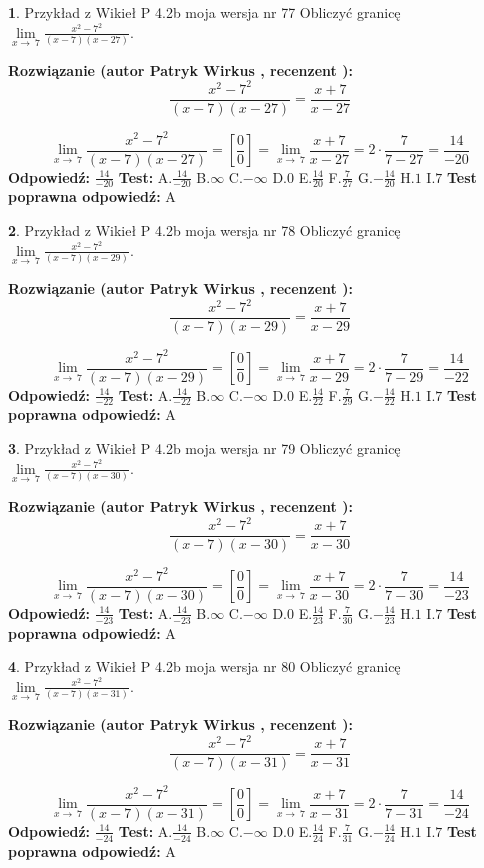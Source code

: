 \documentclass[12pt, a4paper]{article}
\theoremstyle{definition} %
\newtheorem{zad}{}
\newcommand{\zadStart}[1]{\begin{zad}#1\newline}
\newcommand{\zadStop}{\end{zad}}
\newcommand{\rozwStart}[2]{\noindent \textbf{Rozwiązanie (autor #1 , recenzent #2): }\newline}
\newcommand{\rozwStop}{\newline}
\newcommand{\odpStart}{\noindent \textbf{Odpowiedź:}\newline}
\newcommand{\odpStop}{\newline}
\newcommand{\testStart}{\noindent \textbf{Test:}\newline}
\newcommand{\testStop}{\newline}
\newcommand{\kluczStart}{\noindent \textbf{Test poprawna odpowiedź:}\newline}
\newcommand{\kluczStop}{\newline}
\begin{document}
\zadStart{Przykład z Wikieł P 4.2b moja wersja nr 77}
Obliczyć granicę $\lim\limits_{x\to\ 7}\frac{x^{2}-7^{2}}{(x-7)(x-27)}$.
\zadStop
\rozwStart{Patryk Wirkus}{}
$$\frac{x^{2}-7^{2}}{(x-7)(x-27)}=\frac{x+7}{x-27}$$

$$\lim\limits_{x\to\ 7}\frac{x^{2}-7^{2}}{(x-7)(x-27)}=[\frac{0}{0}]=\lim\limits_{x\to\ 7}\frac{x+7}{x-27}=2 \cdot \frac{7}{7-27} = \frac{14}{-20}$$
\rozwStop
\odpStart
$\frac{14}{-20}$
\odpStop
\testStart
A.$\frac{14}{-20}$
B.$\infty$
C.$-\infty$
D.$0$
E.$\frac{14}{20}$
F.$\frac{7}{27}$
G.$-\frac{14}{20}$
H.$1$
I.$7$
\testStop
\kluczStart
A
\kluczStop



\zadStart{Przykład z Wikieł P 4.2b moja wersja nr 78}
Obliczyć granicę $\lim\limits_{x\to\ 7}\frac{x^{2}-7^{2}}{(x-7)(x-29)}$.
\zadStop
\rozwStart{Patryk Wirkus}{}
$$\frac{x^{2}-7^{2}}{(x-7)(x-29)}=\frac{x+7}{x-29}$$

$$\lim\limits_{x\to\ 7}\frac{x^{2}-7^{2}}{(x-7)(x-29)}=[\frac{0}{0}]=\lim\limits_{x\to\ 7}\frac{x+7}{x-29}=2 \cdot \frac{7}{7-29} = \frac{14}{-22}$$
\rozwStop
\odpStart
$\frac{14}{-22}$
\odpStop
\testStart
A.$\frac{14}{-22}$
B.$\infty$
C.$-\infty$
D.$0$
E.$\frac{14}{22}$
F.$\frac{7}{29}$
G.$-\frac{14}{22}$
H.$1$
I.$7$
\testStop
\kluczStart
A
\kluczStop



\zadStart{Przykład z Wikieł P 4.2b moja wersja nr 79}
Obliczyć granicę $\lim\limits_{x\to\ 7}\frac{x^{2}-7^{2}}{(x-7)(x-30)}$.
\zadStop
\rozwStart{Patryk Wirkus}{}
$$\frac{x^{2}-7^{2}}{(x-7)(x-30)}=\frac{x+7}{x-30}$$

$$\lim\limits_{x\to\ 7}\frac{x^{2}-7^{2}}{(x-7)(x-30)}=[\frac{0}{0}]=\lim\limits_{x\to\ 7}\frac{x+7}{x-30}=2 \cdot \frac{7}{7-30} = \frac{14}{-23}$$
\rozwStop
\odpStart
$\frac{14}{-23}$
\odpStop
\testStart
A.$\frac{14}{-23}$
B.$\infty$
C.$-\infty$
D.$0$
E.$\frac{14}{23}$
F.$\frac{7}{30}$
G.$-\frac{14}{23}$
H.$1$
I.$7$
\testStop
\kluczStart
A
\kluczStop



\zadStart{Przykład z Wikieł P 4.2b moja wersja nr 80}
Obliczyć granicę $\lim\limits_{x\to\ 7}\frac{x^{2}-7^{2}}{(x-7)(x-31)}$.
\zadStop
\rozwStart{Patryk Wirkus}{}
$$\frac{x^{2}-7^{2}}{(x-7)(x-31)}=\frac{x+7}{x-31}$$

$$\lim\limits_{x\to\ 7}\frac{x^{2}-7^{2}}{(x-7)(x-31)}=[\frac{0}{0}]=\lim\limits_{x\to\ 7}\frac{x+7}{x-31}=2 \cdot \frac{7}{7-31} = \frac{14}{-24}$$
\rozwStop
\odpStart
$\frac{14}{-24}$
\odpStop
\testStart
A.$\frac{14}{-24}$
B.$\infty$
C.$-\infty$
D.$0$
E.$\frac{14}{24}$
F.$\frac{7}{31}$
G.$-\frac{14}{24}$
H.$1$
I.$7$
\testStop
\kluczStart
A
\kluczStop
\end{document}
